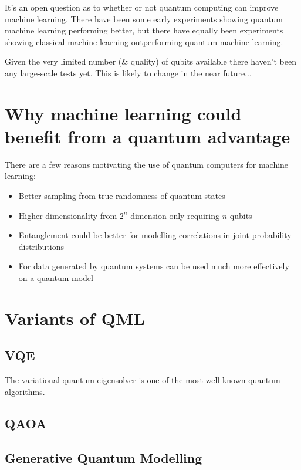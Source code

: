 \documentclass{book}
\begin{document}
It's an open question as to whether or not quantum computing can improve machine learning. There have been some early experiments showing quantum machine learning performing better, but there have equally been experiments showing classical machine learning outperforming quantum machine learning. 

 Given the very limited number (\& quality) of qubits available there haven't been any large-scale tests yet. This is likely to change in the near future...

\section{Why machine learning could benefit from a quantum advantage}

There are a few reasons motivating the use of quantum computers for machine learning:
\begin{itemize}
    \item Better sampling from true randomness of quantum states
    \item Higher dimensionality from $2^n$ dimension only requiring $n$ qubits
    \item Entanglement could be better for modelling correlations in joint-probability distributions
    \item For data generated by quantum systems can be used much \href{https://www.science.org/doi/10.1126/science.abn7293}{more effectively on a quantum model}
\end{itemize}

\section{Variants of QML} 

\subsection{VQE}

The variational quantum eigensolver is one of the most well-known quantum algorithms. 

\subsection{QAOA}

\subsection{Generative Quantum Modelling}
\end{document}
